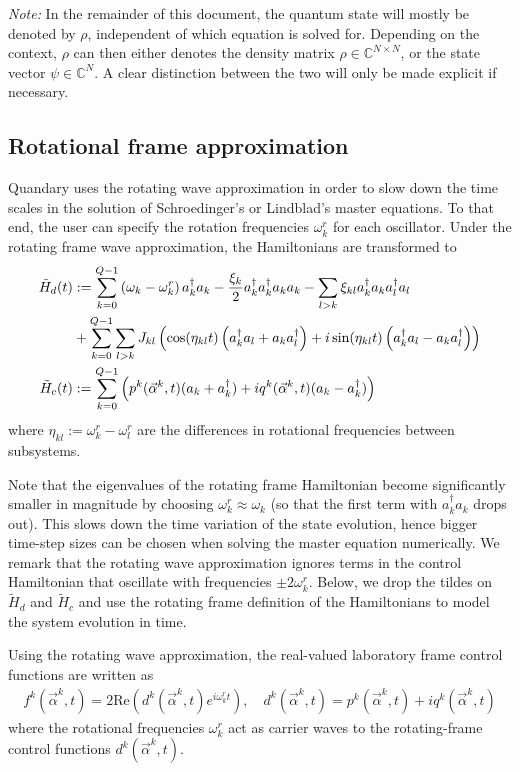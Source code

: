 \documentclass[11pt]{article}
\newcommand{\C}{\mathds{C}}
\begin{document}
\textit{Note:} In the remainder of this document, the quantum state will mostly be denoted by $\rho$, independent of which equation is solved for. Depending on the context, $\rho$ can then either denotes the density matrix $\rho\in \C^{N\times N}$, or the state vector $\psi\in \C^N$. A clear distinction between the two will only be made explicit if necessary.

\subsection{Rotational frame approximation}
Quandary uses the rotating wave approximation in order to slow down the time scales in the solution of Schroedinger's or Lindblad's master equations. To that end, the user can specify the rotation frequencies $\omega_k^r$ for each oscillator. Under the rotating frame wave approximation, the Hamiltonians are transformed to 
\begin{align} 
  \tilde H_d(t) &:= \sum_{k=0}^{Q-1} \left(\omega_k - \omega_k^{r}\right)a_k^{\dagger}a_k- \frac{\xi_k}{2}
  a_k^{\dagger}a_k^{\dagger}a_k a_k  
   - \sum_{l> k} \xi_{kl} a_{k}^{\dagger}a_{k}   a_{l}^{\dagger} a_{l} \notag \\
   & + \sum_{k=0}^{Q-1}\sum_{l>k} J_{kl} \left(\cos(\eta_{kl}t) \left(a_k^\dagger a_l + a_k a_l^\dagger\right) + i\sin(\eta_{kl}t)\left(a_k^\dagger a_l - a_k a_l^\dagger\right) \right) \label{eq:Hd_rotating} \\
   \tilde H_c(t) &:= \sum_{k=0}^{Q-1} \left( p^k(\vec{\alpha}^k,t) (a_k +
   a_k^{\dagger}) + i q^k(\vec{\alpha}^k,t)(a_k - a_k^{\dagger})
   \right)  \label{eq:Hc_rotating}
\end{align} 
where $\eta_{kl} := \omega_k^{r} - \omega_l^{r}$ are the differences in rotational frequencies between subsystems. 

Note that the eigenvalues of the rotating frame Hamiltonian become significantly smaller in magnitude by choosing $\omega_k^r \approx \omega_k$ (so that the first term with $a_k^\dagger a_k$ drops out). This slows down the time variation of the state evolution, hence bigger time-step sizes can be chosen when solving the master equation numerically. We remark that the rotating wave approximation ignores terms in the control Hamiltonian that oscillate with frequencies $\pm 2\omega_k^r$. Below, we drop the tildes on $\tilde H_d$ and $\tilde H_c$ and use the rotating frame definition of the Hamiltonians to model the system evolution in time. 

Using the rotating wave approximation, the real-valued laboratory frame control functions are written as 
\begin{align}
  f^k(\vec{\alpha}^k,t) = 2\mbox{Re}\left(d^k(\vec{\alpha}^k,t)e^{i\omega_k^r t}\right), \quad d^k(\vec{\alpha}^k,t) = p^k(\vec{\alpha}^k,t) + i q^k(\vec{\alpha}^k,t)
\end{align}
where the rotational frequencies $\omega_k^r$ act as carrier waves to the rotating-frame control functions $d^k(\vec{\alpha}^k, t)$. 
\end{document}
